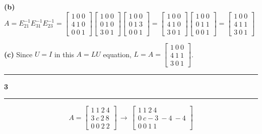 \documentclass[11pt]{article}
\newcommand\question[2]{\vspace{.25in}\hrule\textbf{#1 #2}\vspace{.5em}\hrule\vspace{.10in}}
\renewcommand\part[1]{\vspace{.10in}\textbf{(#1)}}
\begin{document}
\part{b}
\(A = E_{21}^{-1}E_{31}^{-1}E_{23}^{-1} = \begin{bmatrix} 1 \ 0 \ 0 \\ 4 \ 1 \ 0 \\ 0 \ 0 \ 1 \end{bmatrix}\begin{bmatrix} 1 \ 0 \ 0 \\ 0 \ 1 \ 0 \\ 3 \ 0 \ 1 \end{bmatrix}\begin{bmatrix} 1 \ 0 \ 0 \\ 0 \ 1 \ 3 \\ 0 \ 0 \ 1 \end{bmatrix} = \begin{bmatrix} 1 \ 0 \ 0 \\ 4 \ 1 \ 0 \\ 3 \ 0 \ 1 \end{bmatrix}\begin{bmatrix} 1 \ 0 \ 0 \\ 0 \ 1 \ 1 \\ 0 \ 0 \ 1 \end{bmatrix} = \begin{bmatrix} 1 \ 0 \ 0 \\ 4 \ 1 \ 1 \\ 3 \ 0 \ 1 \end{bmatrix}\)

\part{c} Since \(U = I\) in this \(A = LU\) equation, \(L = A = \begin{bmatrix} 1 \ 0 \ 0 \\ 4 \ 1 \ 1 \\ 3 \ 0 \ 1 \end{bmatrix}\).

\question{3}{}
$$A = \begin{bmatrix} 1 \ 1 \ 2 \ 4 \\ 3 \ c \ 2 \ 8 \\ 0 \ 0 \ 2 \ 2 \end{bmatrix}\,\to\,\begin{bmatrix} 1 \ 1 \ 2 \ 4 \\ 0 \ c-3 \ -4 \ -4 \\ 0 \ 0 \ 1 \ 1 \end{bmatrix}$$
\end{document}
